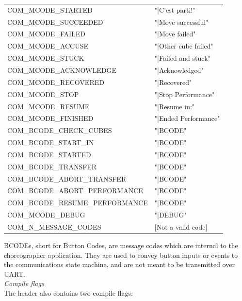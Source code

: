\begin{table}[ht]
\begin{center}
\begin{tabular}{ll}
COM\_MCODE\_STARTED             & "|C'est parti!"      \\
COM\_MCODE\_SUCCEEDED           & "|Move successful"   \\
COM\_MCODE\_FAILED              & "|Move failed"       \\
COM\_MCODE\_ACCUSE              & "|Other cube failed" \\
COM\_MCODE\_STUCK               & "|Failed and stuck"  \\
COM\_MCODE\_ACKNOWLEDGE         & "|Acknowledged"      \\
COM\_MCODE\_RECOVERED           & "|Recovered"         \\
COM\_MCODE\_STOP                & "|Stop Performance"  \\
COM\_MCODE\_RESUME              & "|Resume in:"        \\
COM\_MCODE\_FINISHED            & "|Ended Performance" \\
COM\_BCODE\_CHECK\_CUBES        & "|BCODE"             \\
COM\_BCODE\_START\_IN           & "|BCODE"             \\
COM\_BCODE\_STARTED             & "|BCODE"             \\
COM\_BCODE\_TRANSFER            & "|BCODE"             \\
COM\_BCODE\_ABORT\_TRANSFER     & "|BCODE"             \\
COM\_BCODE\_ABORT\_PERFORMANCE  & "|BCODE"             \\
COM\_BCODE\_RESUME\_PERFORMANCE & "|BCODE"             \\
COM\_MCODE\_DEBUG               & "|DEBUG"             \\
COM\_N\_MESSAGE\_CODES          & [Not a valid code]  \\
 \hline
\end{tabular}
\end{center}
\end{table}

BCODEs, short for Button Codes, are message codes which are internal to the choreographer application. They are used to convey button inputs or events to the communications state machine, and are not meant to be transmitted over UART.\\


\textit{Compile flags}\\

The header also contains two compile flags:\\

